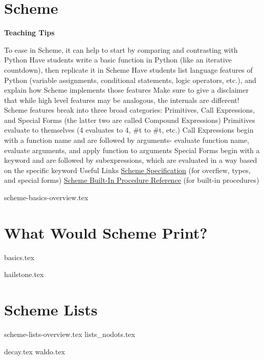 \documentclass{exam}
\begin{document}
\section{Scheme}
\begin{guide}
\begin{blocksection}
\textbf{Teaching Tips}
\begin{outline}[enumerate]
    \1 To ease in Scheme, it can help to start by comparing and contrasting with Python
    \2 Have students write a basic function in Python (like an iterative countdown), then replicate it in Scheme
    \2 Have students list language features of Python (variable assignments, conditional statements, logic operators, etc.), and explain how Scheme implements those features
    \2 Make sure to give a disclaimer that while high level features may be analogous, the internals are different!
    \1 Scheme features break into three broad categories: Primitives, Call Expressions, and Special Forms (the latter two are called Compound Expressions)
    \2 Primitives evaluate to themselves (4 evaluates to 4, \#t to \#t, etc.)
    \2 Call Expressions begin with a function name and are followed by arguments- evaluate function name, evaluate arguments, and apply function to arguments
    \2 Special Forms begin with a keyword and are followed by subexpressions, which are evaluated in a way based on the specific keyword
    \1 Useful Links
    \2 \href{https://cs61a.org/articles/scheme-spec/}{Scheme Specification} (for overfiew, types, and special forms)
    \2 \href{https://cs61a.org/articles/scheme-builtins/}{Scheme Built-In Procedure Reference} (for built-in procedures)
\end{outline}
\end{blocksection}
\end{guide}

{scheme-basics-overview.tex}
\begin{questions}
\newpage
\section{What Would Scheme Print?}
{basics.tex}

{hailstone.tex}

\section{Scheme Lists}
{scheme-lists-overview.tex}
\newpage
{lists_nodots.tex}

{decay.tex}
{waldo.tex}

\end{questions}
\end{document}
